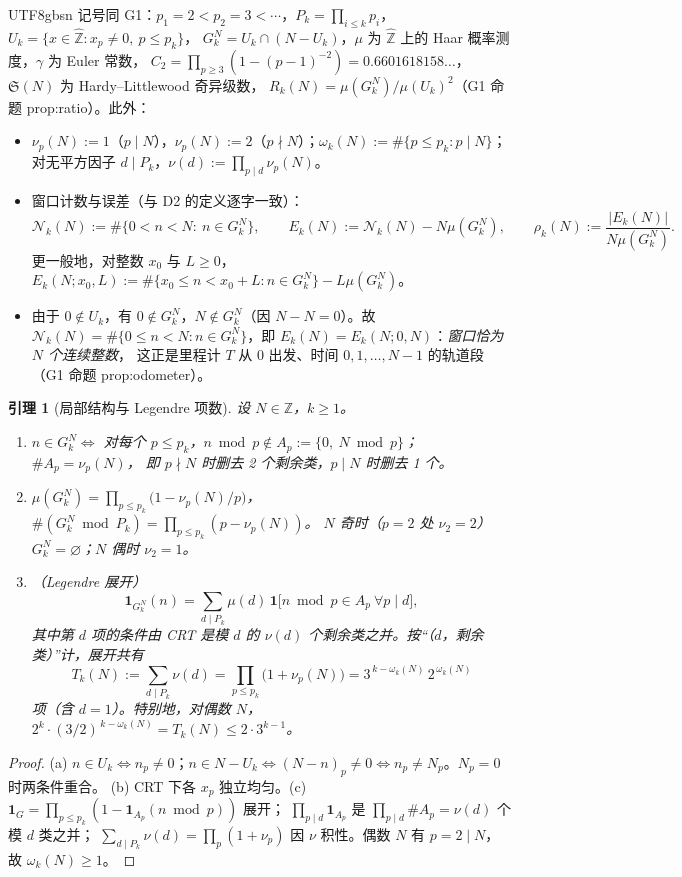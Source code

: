 \documentclass[11pt,a4paper]{article}
\newcommand{\Zhat}{\widehat{\mathbb Z}}
\newcommand{\Haar}{\mu}
\newcommand{\Sing}{\mathfrak S}
\newcommand{\status}[1]{\par\noindent\fbox{\textbf{状态：#1}}\par\smallskip}
\newcommand{\Cnt}{\mathcal N}          %
\newcommand{\Tleg}{T}                   %
\theoremstyle{plain}
\newtheorem{lem}[prop]{引理}
\theoremstyle{definition}
\begin{document}
\begin{CJK}{UTF8}{gbsn}
记号同 G1：$p_1=2<p_2=3<\cdots$，$P_k=\prod_{i\le k}p_i$，$U_k=\{x\in\Zhat:x_p\ne0,\ p\le p_k\}$，
$G_k^N=U_k\cap(N-U_k)$，$\Haar$ 为 $\Zhat$ 上的 Haar 概率测度，$\gamma$ 为 Euler 常数，
$C_2=\prod_{p\ge3}(1-(p-1)^{-2})=0.6601618158\ldots$，$\Sing(N)$ 为 Hardy--Littlewood 奇异级数，
$R_k(N)=\Haar(G_k^N)/\Haar(U_k)^2$（G1 命题 prop:ratio）。此外：
\begin{itemize}[leftmargin=*]
\item $\nu_p(N):=1$（$p\mid N$），$\nu_p(N):=2$（$p\nmid N$）；$\omega_k(N):=\#\{p\le p_k:p\mid N\}$；
对无平方因子 $d\mid P_k$，$\nu(d):=\prod_{p\mid d}\nu_p(N)$。
\item 窗口计数与误差（与 D2 的定义逐字一致）：
\[
\Cnt_k(N):=\#\{0<n<N:\ n\in G_k^N\},\qquad
E_k(N):=\Cnt_k(N)-N\Haar(G_k^N),\qquad
\rho_k(N):=\frac{|E_k(N)|}{N\Haar(G_k^N)} .
\]
更一般地，对整数 $x_0$ 与 $L\ge0$，$E_k(N;x_0,L):=\#\{x_0\le n<x_0+L:n\in G_k^N\}-L\Haar(G_k^N)$。
\item 由于 $0\notin U_k$，有 $0\notin G_k^N$，$N\notin G_k^N$（因 $N-N=0$）。故
$\Cnt_k(N)=\#\{0\le n<N:n\in G_k^N\}$，即 $E_k(N)=E_k(N;0,N)$：\emph{窗口恰为 $N$ 个连续整数}，
这正是里程计 $T$ 从 $0$ 出发、时间 $0,1,\dots,N-1$ 的轨道段（G1 命题 prop:odometer）。
\end{itemize}

\begin{lem}[局部结构与 Legendre 项数]\label{lem:local}
设 $N\in\mathbb Z$，$k\ge1$。
\begin{enumerate}[label=(\alph*)]
\item $n\in G_k^N\iff$ 对每个 $p\le p_k$，$n\bmod p\notin A_p:=\{0,\ N\bmod p\}$；$\#A_p=\nu_p(N)$，
即 $p\nmid N$ 时删去 2 个剩余类，$p\mid N$ 时删去 1 个。
\item $\Haar(G_k^N)=\prod_{p\le p_k}\bigl(1-\nu_p(N)/p\bigr)$，$\#(G_k^N\bmod P_k)=\prod_{p\le p_k}(p-\nu_p(N))$。
$N$ 奇时（$p=2$ 处 $\nu_2=2$）$G_k^N=\varnothing$；$N$ 偶时 $\nu_2=1$。
\item（Legendre 展开）
\[
\mathbf 1_{G_k^N}(n)=\sum_{d\mid P_k}\mu(d)\,\mathbf 1\bigl[n\bmod p\in A_p\ \forall p\mid d\bigr],
\]
其中第 $d$ 项的条件由 CRT 是模 $d$ 的 $\nu(d)$ 个剩余类之并。按“（$d$，剩余类）”计，展开共有
\[
\Tleg_k(N):=\sum_{d\mid P_k}\nu(d)=\prod_{p\le p_k}\bigl(1+\nu_p(N)\bigr)=3^{\,k-\omega_k(N)}\,2^{\,\omega_k(N)}
\]
项（含 $d=1$）。特别地，对偶数 $N$，$2^{k}\cdot(3/2)^{\,k-\omega_k(N)}=\Tleg_k(N)\le2\cdot3^{k-1}$。
\end{enumerate}
\end{lem}
\status{已证}
\begin{proof}
(a) $n\in U_k\iff n_p\neq0$；$n\in N-U_k\iff (N-n)_p\ne0\iff n_p\ne N_p$。$N_p=0$ 时两条件重合。
(b) CRT 下各 $x_p$ 独立均匀。(c) $\mathbf 1_{G}=\prod_{p\le p_k}(1-\mathbf 1_{A_p}(n\bmod p))$ 展开；
$\prod_{p\mid d}\mathbf 1_{A_p}$ 是 $\prod_{p\mid d}\#A_p=\nu(d)$ 个模 $d$ 类之并；
$\sum_{d\mid P_k}\nu(d)=\prod_p(1+\nu_p)$ 因 $\nu$ 积性。偶数 $N$ 有 $p=2\mid N$，故 $\omega_k(N)\ge1$。
\end{proof}


\end{CJK}
\end{document}
